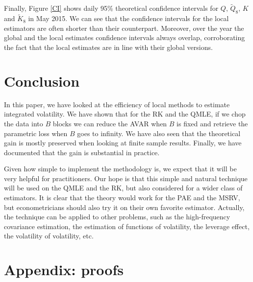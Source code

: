 \documentclass[11pt]{article}
\numberwithin{equation}{section}
\theoremstyle{plain}
\theoremstyle{remark}
\begin{document}
\smallskip
Finally, Figure \ref{CI} shows daily 95\% theoretical confidence intervals for $Q$, $\tilde{Q}_8$, $K$ and $\tilde{K}_8$ in May 2015. We can see that the confidence intervals for the local estimators are often shorter than their counterpart. Moreover, over the year the global and the local estimates confidence intervals always overlap, corroborating the fact that the local estimates are in line with their global versions.  

\section{Conclusion}
In this paper, we have looked at the efficiency of local methods to estimate integrated volatility. We have shown that for the RK and the QMLE, if we chop the data into $B$ blocks we can reduce the AVAR when $B$ is fixed and retrieve the parametric loss when $B$ goes to infinity. We have also seen that the theoretical gain is mostly preserved when looking at finite sample results. Finally, we have documented that the gain is substantial in practice.

\smallskip
Given how simple to implement the methodology is, we expect that it will be very helpful for practitioners. Our hope is that this simple and natural technique will be used on the QMLE and the RK, but also considered for a wider class of estimators. It is clear that the theory would work for the PAE and the MSRV, but econometricians should also try it on their own favorite estimator. Actually, the technique can be applied to other problems, such as the high-frequency covariance estimation, the estimation of functions of volatility, the leverage effect, the volatility of volatility, etc.

\section{Appendix: proofs} \label{Appendix}
\end{document}
